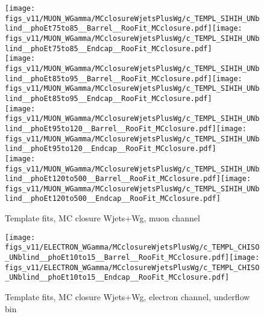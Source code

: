 \begin{figure}[htb]
  \begin{center}
   \texttt{[image: figs\_v11/MUON\_WGamma/MCclosureWjetsPlusWg/c\_TEMPL\_SIHIH\_UNblind\_\_phoEt75to85\_\_Barrel\_\_RooFit\_MCclosure.pdf]}\texttt{[image: figs\_v11/MUON\_WGamma/MCclosureWjetsPlusWg/c\_TEMPL\_SIHIH\_UNblind\_\_phoEt75to85\_\_Endcap\_\_RooFit\_MCclosure.pdf]}\\
   \texttt{[image: figs\_v11/MUON\_WGamma/MCclosureWjetsPlusWg/c\_TEMPL\_SIHIH\_UNblind\_\_phoEt85to95\_\_Barrel\_\_RooFit\_MCclosure.pdf]}\texttt{[image: figs\_v11/MUON\_WGamma/MCclosureWjetsPlusWg/c\_TEMPL\_SIHIH\_UNblind\_\_phoEt85to95\_\_Endcap\_\_RooFit\_MCclosure.pdf]}\\
   \texttt{[image: figs\_v11/MUON\_WGamma/MCclosureWjetsPlusWg/c\_TEMPL\_SIHIH\_UNblind\_\_phoEt95to120\_\_Barrel\_\_RooFit\_MCclosure.pdf]}\texttt{[image: figs\_v11/MUON\_WGamma/MCclosureWjetsPlusWg/c\_TEMPL\_SIHIH\_UNblind\_\_phoEt95to120\_\_Endcap\_\_RooFit\_MCclosure.pdf]}\\
   \texttt{[image: figs\_v11/MUON\_WGamma/MCclosureWjetsPlusWg/c\_TEMPL\_SIHIH\_UNblind\_\_phoEt120to500\_\_Barrel\_\_RooFit\_MCclosure.pdf]}\texttt{[image: figs\_v11/MUON\_WGamma/MCclosureWjetsPlusWg/c\_TEMPL\_SIHIH\_UNblind\_\_phoEt120to500\_\_Endcap\_\_RooFit\_MCclosure.pdf]}\\
  \label{fig:templateFits_MCclosureWjetsPlusWg_SIHIH_MUON_3}
  \caption{Template fits, MC closure Wjets+Wg, muon channel}
  \end{center}
\end{figure}











\begin{figure}[htb]
  \begin{center}
   \texttt{[image: figs\_v11/ELECTRON\_WGamma/MCclosureWjetsPlusWg/c\_TEMPL\_CHISO\_UNblind\_\_phoEt10to15\_\_Barrel\_\_RooFit\_MCclosure.pdf]}\texttt{[image: figs\_v11/ELECTRON\_WGamma/MCclosureWjetsPlusWg/c\_TEMPL\_CHISO\_UNblind\_\_phoEt10to15\_\_Endcap\_\_RooFit\_MCclosure.pdf]}\\
  \label{fig:templateFits_MCclosureWjetsPlusWg_CHISO_ELECTRON_0}
  \caption{Template fits, MC closure Wjets+Wg, electron channel, underflow bin}
  \end{center}
\end{figure}

